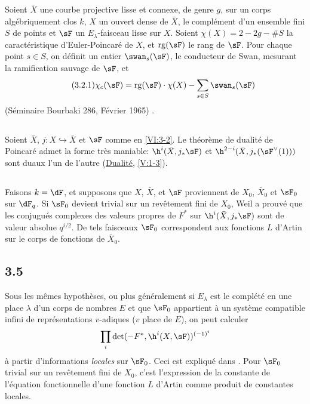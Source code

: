 Soient $\bar X$ une courbe projective lisse et connexe, de genre $g$, sur un 
corps algébriquement clos $k$, $X$ un ouvert dense de $\bar X$, 
le complément d'un ensemble fini $S$ de points et $\sF$ un 
$E_\lambda$-faisceau lisse sur $X$. Soient $\chi(X)=2-2 g-\# S$ la 
caractéristique d'Euler-Poincaré de $X$, et $\operatorname{rg}(\sF)$ le 
rang de $\sF$. Pour chaque point $s\in S$, on définit un entier 
$\swan_s(\sF)$, le conducteur de Swan, mesurant la ramification sauvage de 
$\sF$, et 
\begin{align*}\tag{3.2.1}\label{VI:eq:3-2-1}
  \chi_c(\sF) = \operatorname{rg}(\sF) \cdot \chi(X) - \sum_{s\in S} \swan_s(\sF) 
\end{align*}
(Séminaire Bourbaki 286, Février 1965) \cite{ra65}. 





\subsection{}\label{VI:3-3}

Soient $\bar X$, $j:X\hookrightarrow\bar X$ et $\sF$ comme en \ref{VI:3-2}. Le 
théorème de dualité de Poincaré admet la forme très maniable: 
$\h^i(\bar X,j_\ast \sF)$ et $\h^{2-i}(\bar X,j_\ast(\sF^\vee(1)))$ sont 
duaux l'un de l'autre (\hyperref[V]{Dualité}, \ref{V:1-3}). 





\subsection{}\label{VI:3-4}

Faisons $k=\dF$, et supposons que $X$, $\bar X$, et $\sF$ proviennent de 
$X_0$, $\bar X_0$ et $\sF_0$ sur $\dF_q$. Si $\sF_0$ devient trivial sur un 
revêtement fini de $X_0$, Weil a prouvé que les conjugués complexes des 
valeurs propres de $F^\ast$ sur $\h^i(\bar X,j_\ast\sF)$ sont de valeur 
absolue $q^{i/2}$. De tels faisceaux $\sF_0$ correspondent aux fonctions $L$ 
d'Artin sur le corps de fonctions de $\bar X_0$. 





\subsection*{3.5}\label{VI:3-5_} %

Sous les mêmes hypothèses, ou plus généralement si $E_\lambda$ est le 
complété en une place $\lambda$ d'un corps de nombres $E$ et que $\sF_0$ 
appartient à un système compatible infini de représentations $v$-adiques 
($v$ place de $E$), on peut calculer 
\[
  \prod_i \det(-F^\ast,\h^i(X,\sF))^{(-1)^i} 
\]
à partir d'informations \emph{locales} sur $\sF_0$. Ceci est expliqué dans 
\cite{de73}. Pour $\sF_0$ trivial sur un revêtement fini de $X_0$, c'est 
l'expression de la constante de l'équation fonctionnelle d'une fonction $L$ 
d'Artin comme produit de constantes locales. 





